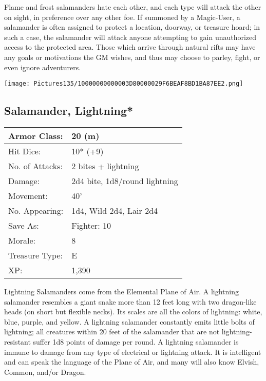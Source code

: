 \documentclass[a4paper,twoside,openany,10pt]{book}
\begin{document}
\begin{multicols}{2}
Flame and frost salamanders hate each other, and each type will attack the other on sight, in preference over any other foe. If summoned by a Magic-User, a salamander is often assigned to protect a location, doorway, or treasure hoard; in such a case, the salamander will attack anyone attempting to gain unauthorized access to the protected area. Those which arrive through natural rifts may have any goals or motivations the GM wishes, and thus may choose to parley, fight, or even ignore adventurers.

\vfill

\begin{center} \texttt{[image: Pictures135/10000000000003D80000029F6BEAF8BD1BA87EE2.png]} \end{center}


\subsection*{Salamander, Lightning*}\label{salamander-lightning}

\begin{tabularx}{0.50\textwidth}{@{}lX@{}}
Armor Class: & 20 (m) \\\hline
Hit Dice: & 10* (+9) \\\hline
No. of Attacks: & 2 bites + lightning \\\hline
Damage: & 2d4 bite, 1d8/round lightning \\\hline
Movement: & 40' \\\hline
No. Appearing: & 1d4, Wild 2d4, Lair 2d4 \\\hline
Save As: & Fighter: 10 \\\hline
Morale: & 8 \\\hline
Treasure Type: & E \\\hline
XP: & 1,390 \\\hline
\end{tabularx}\medskip

Lightning Salamanders come from the Elemental Plane of Air. A lightning salamander resembles a giant snake more than 12 feet long with two dragon-like heads (on short but flexible necks). Its scales are all the colors of lightning: white, blue, purple, and yellow. A lightning salamander constantly emits little bolts of lightning; all creatures within 20 feet of the salamander that are not lightning-resistant suffer 1d8 points of damage per round. A lightning salamander is immune to damage from any type of electrical or lightning attack. It is intelligent and can speak the language of the Plane of Air, and many will also know Elvish, Common, and/or Dragon.


\end{multicols}
\end{document}
